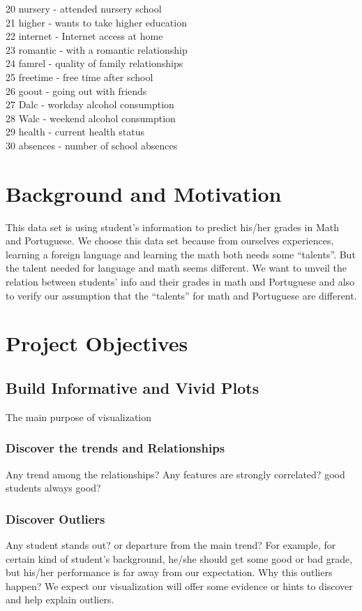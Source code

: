 \documentclass{article}
\begin{document}
20 nursery - attended nursery school  \\
21 higher - wants to take higher education  \\
22 internet - Internet access at home  \\
23 romantic - with a romantic relationship  \\
24 famrel - quality of family relationships  \\
25 freetime - free time after school  \\
26 goout - going out with friends \\
27 Dalc - workday alcohol consumption  \\
28 Walc - weekend alcohol consumption  \\
29 health - current health status  \\
30 absences - number of school absences \\
\section{Background and Motivation}
This data set is using student's information to predict his/her grades in Math and Portuguese.
We choose this data set because from ourselves experiences, learning a foreign language and learning the math both needs some ``talents''. But the talent needed for language and math seems different. We want to unveil the relation between students' info and their grades in math and Portuguese and also to verify our assumption that the ``talents'' for math and Portuguese are different.
\section{Project Objectives}
\subsection{Build Informative and Vivid Plots}
The main purpose of visualization 
\subsubsection{Discover the trends and Relationships}
Any trend among the relationships? Any features are strongly correlated?  good students always good? 
\subsubsection{Discover Outliers}
Any student stands out? or departure from the main trend? For example, for certain kind of student's background, he/she should get some good or bad grade, but his/her performance is far away from our expectation. Why this outliers happen? We expect our visualization will offer some evidence or hints to discover and help explain outliers.
\end{document}
